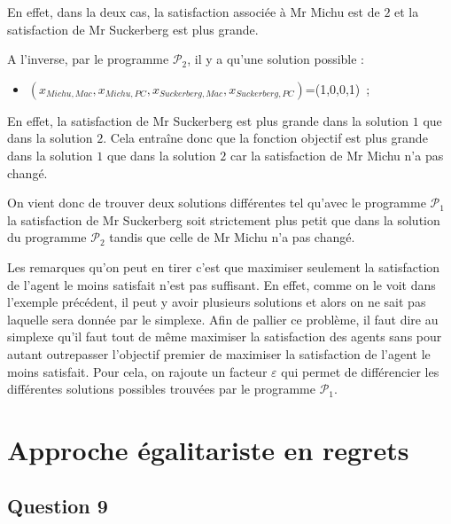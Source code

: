 \documentclass[a4paper, titlepage, oneside, 12pt]{article}%
\begin{document}
En effet, dans la deux cas, la satisfaction associée à Mr Michu est de $2$ et la satisfaction de Mr Suckerberg est plus  grande.

A l'inverse, par le programme $\mathcal{P}_2$, il y a qu'une solution possible :
\begin{itemize}
\item $(x_{Michu, Mac},x_{Michu, PC},x_{Suckerberg, Mac},x_{Suckerberg, PC})$=(1,0,0,1)~;
\end{itemize}

En effet, la satisfaction de Mr Suckerberg est plus grande dans la solution $1$ que dans la solution $2$. Cela entraîne donc que la fonction objectif est plus grande dans la solution $1$ que dans la solution $2$ car la satisfaction de Mr Michu n'a pas changé.

On vient donc de trouver deux solutions différentes tel qu'avec le programme $\mathcal{P}_1$ la satisfaction de Mr Suckerberg soit strictement plus petit que dans la solution du programme $\mathcal{P}_2$ tandis que celle de Mr Michu n'a pas changé.

Les remarques qu'on peut en tirer c'est que maximiser seulement la satisfaction de l'agent le moins satisfait n'est pas suffisant. En effet, comme on le voit dans l'exemple précédent, il peut y avoir plusieurs solutions et alors on ne sait pas laquelle sera donnée par le simplexe. Afin de pallier ce problème, il faut dire au simplexe qu'il faut tout de même maximiser la satisfaction des agents sans pour autant outrepasser l'objectif premier de maximiser la satisfaction de l'agent le moins satisfait. Pour cela, on rajoute un facteur $\varepsilon$ qui permet de différencier les différentes solutions possibles trouvées par le programme $\mathcal{P}_1$.



\section{Approche égalitariste en regrets}

\subsection{Question 9}
\end{document}
